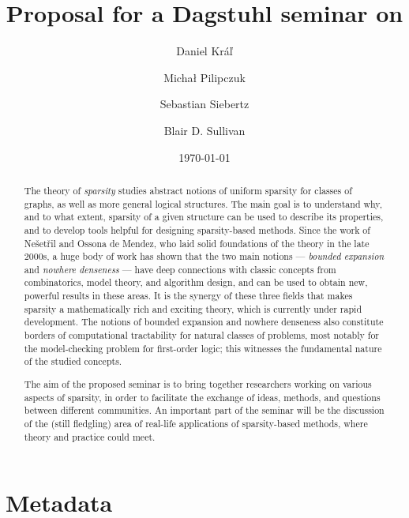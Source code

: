 \documentclass[10pt]{article}
\title{{\large{Proposal for a Dagstuhl seminar on}}\\
  {\huge{\textbf{\ourtitle}}}}
\author{
  Daniel Kr\'a\v{l} \and
  Micha\l{} Pilipczuk \and
  Sebastian Siebertz\and
  Blair D. Sullivan 
}
\date{\today}
\begin{document}
\maketitle

\begin{abstract}
The theory of {\em{sparsity}} studies abstract notions of uniform sparsity for classes of graphs, as well as more general logical structures.
The main goal is to understand why, and to what extent, sparsity of a given structure can be used to describe its properties, 
and to develop tools helpful for designing sparsity-based methods.
Since the work of Ne\v{s}et\v{r}il and Ossona de Mendez, who laid solid foundations of the theory in the late 2000s, 
a huge body of work has shown that the two main notions --- {\em{bounded expansion}} and {\em{nowhere denseness}} ---
have deep connections with classic concepts from combinatorics, model theory, and algorithm design, and can be used to obtain new, powerful results in these areas.
It is the synergy of these three fields that makes sparsity a mathematically rich and exciting theory, which is currently under rapid development.
The notions of bounded expansion and nowhere denseness also constitute borders of computational tractability for natural classes of problems, 
most notably for the model-checking problem for first-order logic; this witnesses the fundamental nature of the studied concepts.

The aim of the proposed seminar is to bring together researchers working on various aspects of sparsity, in order to facilitate 
the exchange of ideas, methods, and questions between different communities. An important part of the seminar will be the discussion
of the (still fledgling) area of real-life applications of sparsity-based methods, where theory and practice could meet.
\end{abstract}

\section{Metadata}
\end{document}
